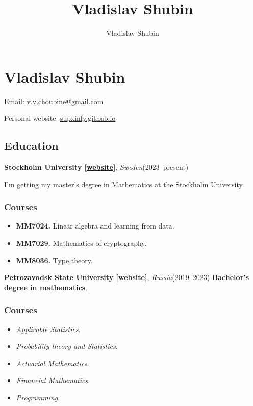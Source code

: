 \documentclass[11pt]{article}
\author{Vladislav Shubin}
\title{Vladislav Shubin}
\begin{document}
\section*{Vladislav Shubin}

\begin{center}
	Email: \href{mailto:v.v.choubine@gmail.com}{v.v.choubine@gmail.com}
	
	Personal website: \href{https://supxinfy.github.io}{supxinfy.github.io}
\end{center}

\subsection*{Education}

\textbf{Stockholm University [\href{https://www.su.se}{website}]}, \textit{Sweden}\hfill(2023--present)

I'm getting my master's degree in Mathematics at the Stockholm University.

\subsubsection*{Courses}
\begin{itemize}
\item\textbf{MM7024.} Linear algebra and learning from data.
\item\textbf{MM7029.} Mathematics of cryptography.
\item\textbf{MM8036.} Type theory.
\end{itemize}

\vspace{2mm}
\noindent\textbf{Petrozavodsk State University [\href{https://petrsu.ru}{website}]}, \textit{Russia}\hfill(2019--2023)
\textbf{Bachelor's degree in mathematics}.
\subsubsection*{Courses}
\begin{itemize}
\item\textbf{} \textit{Applicable Statistics}.
\item\textbf{} \textit{Probability theory and Statistics}.
\item\textbf{} \textit{Actuarial Mathematics}.
\item\textbf{} \textit{Financial Mathematics}.
\item\textbf{} \textit{Programming}.
\end{itemize}
\end{document}
